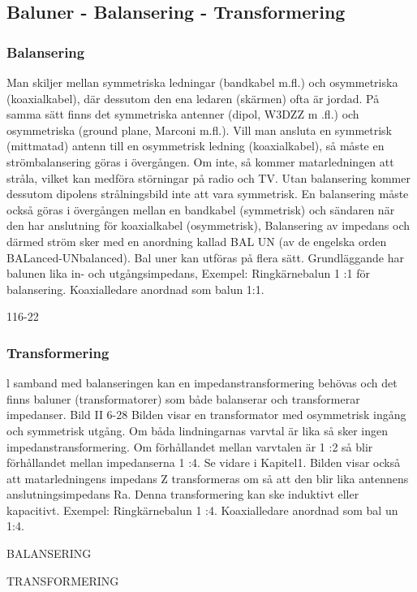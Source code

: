 \subsection{Baluner - Balansering - Transformering}

\subsubsection{Balansering}

Man skiljer mellan symmetriska ledningar
(bandkabel m.fl.) och osymmetriska (koaxialkabel), där dessutom den ena ledaren (skärmen) ofta är jordad.
På samma sätt finns det symmetriska
antenner (dipol, W3DZZ m .fl.) och osymmetriska (ground plane, Marconi m.fl.).
Vill man ansluta en symmetrisk (mittmatad) antenn till en osymmetrisk ledning
(koaxialkabel), så måste en strömbalansering göras i övergången. Om inte, så kommer matarledningen att stråla, vilket kan
medföra störningar på radio och TV. Utan
balansering kommer dessutom dipolens
strålningsbild inte att vara symmetrisk.
En balansering måste också göras i övergången mellan en bandkabel (symmetrisk)
och sändaren när den har anslutning för
koaxialkabel (osymmetrisk),
Balansering av impedans och därmed
ström sker med en anordning kallad BAL UN
(av de engelska orden BALanced-UNbalanced).
Bal uner kan utföras på flera sätt. Grundläggande har balunen lika in- och utgångsimpedans,
Exempel:
Ringkärnebalun 1 :1 för balansering.
Koaxialledare anordnad som balun 1:1.

116-22

\subsubsection{Transformering}
l samband med balanseringen kan en
impedanstransformering behövas och det
finns baluner (transformatorer) som både
balanserar och transformerar impedanser.
Bild II 6-28
Bilden visar en transformator med osymmetrisk ingång och symmetrisk utgång. Om
båda lindningarnas varvtal är lika så sker
ingen impedanstransformering. Om förhållandet mellan varvtalen är 1 :2 så blir förhållandet mellan impedanserna 1 :4. Se vidare
i Kapitel1.
Bilden visar också att matarledningens
impedans Z transformeras om så att den blir
lika antennens anslutningsimpedans Ra.
Denna transformering kan ske induktivt eller kapacitivt.
Exempel:
Ringkärnebalun 1 :4.
Koaxialledare anordnad som bal un 1:4.

BALANSERING

TRANSFORMERING

